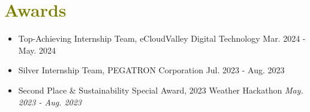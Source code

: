 \documentclass[a4paper, 11pt]{article}
\begin{document}
\section{\textcolor{olive}{\textbf{Awards}}}

    \vspace{1.0mm}

    \begin{itemize}[
        leftmargin=0.20in, 
        label={-}, 
        itemsep=-2pt, 
        topsep=0pt,
        rightmargin=0.10in
    ]
        \item Top-Achieving Internship Team, eCloudValley Digital Technology \hfill \hspace{-0.2cm} {\footnotesize{Mar. 2024 - May. 2024}}
        \item Silver Internship Team, PEGATRON Corporation \hfill {\footnotesize{Jul. 2023 - Aug. 2023}}
        \item Second Place \& Sustainability Special Award, 2023 Weather Hackathon \hfill \textit{\footnotesize{May. 2023 - Aug. 2023}}
    \end{itemize}
\end{document}
